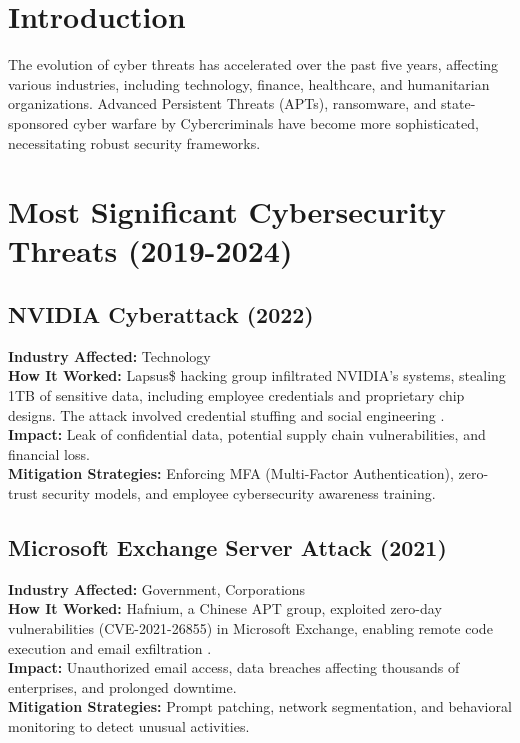 \documentclass[a4paper,12pt]{article}
\begin{document}
\tableofcontents
\newpage

\section{Introduction}
The evolution of cyber threats has accelerated over the past five years, affecting various industries, including technology, finance, healthcare, and humanitarian organizations. Advanced Persistent Threats (APTs), ransomware, and state-sponsored cyber warfare by Cybercriminals have become more sophisticated, necessitating robust security frameworks.

\section{Most Significant Cybersecurity Threats (2019-2024)}

\subsection{NVIDIA Cyberattack (2022)}
\textbf{Industry Affected:} Technology \\
\textbf{How It Worked:} Lapsus\$ hacking group infiltrated NVIDIA's systems, stealing 1TB of sensitive data, including employee credentials and proprietary chip designs. The attack involved credential stuffing and social engineering \cite{lap2022}.\\
\textbf{Impact:} Leak of confidential data, potential supply chain vulnerabilities, and financial loss.\\
\textbf{Mitigation Strategies:} Enforcing MFA (Multi-Factor Authentication), zero-trust security models, and employee cybersecurity awareness training.

\subsection{Microsoft Exchange Server Attack (2021)}
\textbf{Industry Affected:} Government, Corporations \\
\textbf{How It Worked:} Hafnium, a Chinese APT group, exploited zero-day vulnerabilities (CVE-2021-26855) in Microsoft Exchange, enabling remote code execution and email exfiltration \cite{hafnium2021}.\\
\textbf{Impact:} Unauthorized email access, data breaches affecting thousands of enterprises, and prolonged downtime.\\
\textbf{Mitigation Strategies:} Prompt patching, network segmentation, and behavioral monitoring to detect unusual activities.
\end{document}
